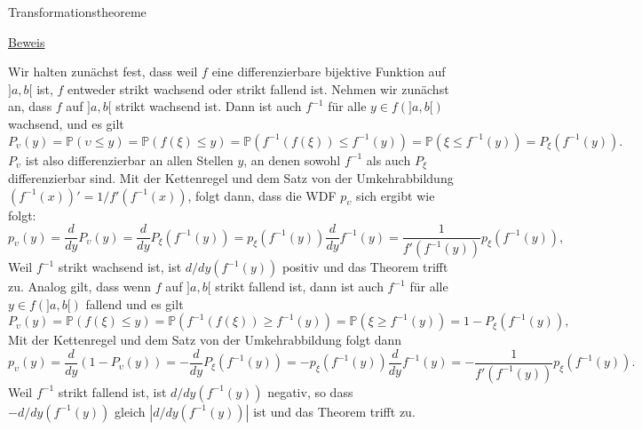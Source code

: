 \documentclass[
  8pt,
  ignorenonframetext,
]{beamer}
\newcommand{\ups}{\upsilon}
\begin{document}
\begin{frame}{Transformationstheoreme}
\protect\hypertarget{transformationstheoreme-2}{}
\tiny
{}

\underline{Beweis}

Wir halten zunächst fest, dass weil \(f\) eine differenzierbare
bijektive Funktion auf \(]a,b[\) ist, \(f\) entweder strikt wachsend
oder strikt fallend ist. Nehmen wir zunächst an, dass \(f\) auf
\(]a,b[\) strikt wachsend ist. Dann ist auch \(f^{-1}\) für alle
\(y \in f(]a,b[)\) wachsend, und es gilt \begin{equation*}
P_\ups(y)
= \mathbb{P}(\ups \le y)
= \mathbb{P}\left(f(\xi) \le y\right)
= \mathbb{P}\left(f^{-1}(f(\xi)) \le f^{-1}(y)\right)
= \mathbb{P}\left(\xi \le f^{-1}(y)\right)
= P_\xi\left(f^{-1}(y)\right).
\end{equation*} \(P_\ups\) ist also differenzierbar an allen Stellen
\(y\), an denen sowohl \(f^{-1}\) als auch \(P_\xi\) differenzierbar
sind. Mit der Kettenregel und dem Satz von der Umkehrabbildung
\((f^{-1}(x))' = 1/f'(f^{-1}(x))\), folgt dann, dass die WDF \(p_\ups\)
sich ergibt wie folgt: \begin{equation*}
p_\ups(y)
= \frac{d}{dy}P_\ups(y)
= \frac{d}{dy}P_\xi\left(f^{-1}(y)\right)
= p_\xi\left(f^{-1}(y)\right)\frac{d}{dy}f^{-1}(y)
= \frac{1}{f'\left(f^{-1}(y)\right)} p_\xi\left(f^{-1}(y)\right),
\end{equation*} Weil \(f^{-1}\) strikt wachsend ist, ist
\(d/dy (f^{-1}(y))\) positiv und das Theorem trifft zu. Analog gilt,
dass wenn \(f\) auf \(]a,b[\) strikt fallend ist, dann ist auch
\(f^{-1}\) für alle \(y \in f(]a,b[)\) fallend und es gilt
\begin{equation*}
P_\ups(y)
= \mathbb{P}(f(\xi) \le y)
= \mathbb{P}\left(f^{-1}(f(\xi)) \ge f^{-1}(y)\right)
= \mathbb{P}\left(\xi \ge f^{-1}(y)\right)
= 1 - P_\xi\left(f^{-1}(y) \right),
\end{equation*} Mit der Kettenregel und dem Satz von der Umkehrabbildung
folgt dann \begin{equation*}
p_\ups(y)
= \frac{d}{dy}(1 - P_\ups(y))
= -\frac{d}{dy}P_\xi\left(f^{-1}(y)\right)
= -p_\xi\left(f^{-1}(y)\right)\frac{d}{dy}f^{-1}(y)
= -\frac{1}{f'\left(f^{-1}(y)\right)} p_\xi\left(f^{-1}(y)\right).
\end{equation*} Weil \(f^{-1}\) strikt fallend ist, ist
\(d/dy (f^{-1}(y))\) negativ, so dass \(-d/dy (f^{-1}(y))\) gleich
\(|d/dy (f^{-1}(y))|\) ist und das Theorem trifft zu.
\end{frame}
\end{document}
